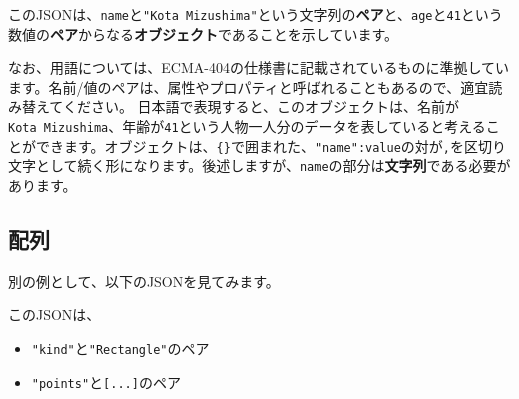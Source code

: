 このJSONは、\texttt{name}と\texttt{"Kota\ Mizushima"}という文字列の\textbf{ペア}と、\texttt{age}と\texttt{41}という数値の\textbf{ペア}からなる\textbf{オブジェクト}であることを示しています。

なお、用語については、ECMA-404の仕様書に記載されているものに準拠しています。名前/値のペアは、属性やプロパティと呼ばれることもあるので、適宜読み替えてください。
日本語で表現すると、このオブジェクトは、名前が\texttt{Kota\ Mizushima}、年齢が\texttt{41}という人物一人分のデータを表していると考えることができます。オブジェクトは、\texttt{\{\}}で囲まれた、\texttt{"name":value}の対が\texttt{,}を区切り文字として続く形になります。後述しますが、\texttt{name}の部分は\textbf{文字列}である必要があります。

\hypertarget{chapter3-ux914dux5217}{%
\subsection{配列}\label{chapter3-ux914dux5217}}

別の例として、以下のJSONを見てみます。

\begin{Shaded}
\begin{Highlighting}[]
\NormalTok{\{}
  \OperatorTok{:}\OperatorTok{,}
  \OperatorTok{:}\NormalTok{ [}
\NormalTok{    \{}\OperatorTok{:}\OperatorTok{,}   \OperatorTok{:}\NormalTok{  \}}\OperatorTok{,}
\NormalTok{    \{}\OperatorTok{:}\OperatorTok{,}   \OperatorTok{:}\NormalTok{\}}\OperatorTok{,}
\NormalTok{    \{}\OperatorTok{:}\OperatorTok{,} \OperatorTok{:}\NormalTok{\}}\OperatorTok{,}
\NormalTok{    \{}\OperatorTok{:}\OperatorTok{,} \OperatorTok{:}\NormalTok{  \}}\OperatorTok{,}
\NormalTok{  ]}
\NormalTok{\}}
\end{Highlighting}
\end{Shaded}

このJSONは、

\begin{itemize}
\tightlist
\item
  \texttt{"kind"}と\texttt{"Rectangle"}のペア
\item
  \texttt{"points"}と\texttt{{[}...{]}}のペア
\end{itemize}

